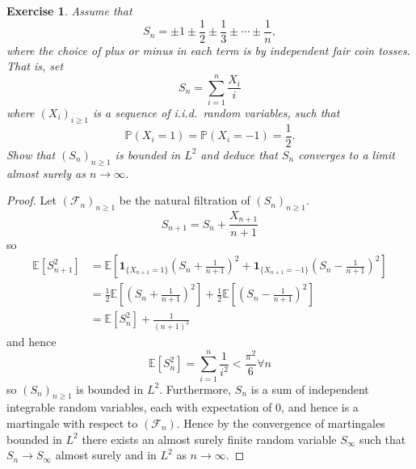 \documentclass{article}
\newtheorem{exercise}[theorem]{Exercise}
\begin{document}
\begin{exercise}
Assume that 
\[
S_n = \pm 1 \pm \frac{1}{2} \pm \frac{1}{3} \pm \cdots \pm \frac{1}{n},
\]
where the choice of plus or minus in each term is by independent fair coin tosses. That is, set 
\[
S_n = \sum_{i=1}^n \frac{X_i}{i}
\]
where $(X_i)_{i \geq 1}$ is a sequence of i.i.d.\ random variables, such that 
\[
\mathbb{P}(X_i = 1) = \mathbb{P}(X_i = -1) = \frac{1}{2}.
\]
Show that $(S_n)_{n \geq 1}$ is bounded in $L^2$ and deduce that $S_n$ converges to a limit almost surely as $n \to \infty$.
\end{exercise}
\begin{proof}
Let $(\mathcal{F}_n)_{n\geq1}$ be the natural filtration of $(S_n)_{n\geq1}$. \[S_{n+1}=S_n+\frac{X_{n+1}}{n+1}\] so \begin{align*}\mathbb{E}[S_{n+1}^2]&=\mathbb{E}\left[\mathbf{1}_{\{X_{n+1}=1\}}\left(S_n+\frac{1}{n+1}\right)^2+\mathbf{1}_{\{X_{n+1}=-1\}}\left(S_n-\frac{1}{n+1}\right)^2\right]\\&=\frac{1}{2}\mathbb{E}\left[\left(S_n+\frac{1}{n+1}\right)^2\right]+\frac{1}{2}\mathbb{E}\left[\left(S_n-\frac{1}{n+1}\right)^2\right]\\&=\mathbb{E}[S_n^2]+\frac{1}{(n+1)^2}\end{align*} and hence\[\mathbb{E}[S_n^2]=\sum_{i=1}^n\frac{1}{i^2}<\frac{\pi^2}{6}\forall n\] so $(S_n)_{n\geq 1}$ is bounded in $L^2$. Furthermore, $S_n$ is a sum of independent integrable random variables, each with expectation of $0$, and hence is a martingale with respect to $(\mathcal{F}_n)$. Hence by the convergence of martingales bounded in $L^2$ there exists an almost surely finite random variable $S_\infty$ such that $S_n\to S_\infty$ almost surely and in $L^2$ as $n\to\infty$.
\end{proof}
\end{document}
